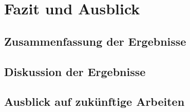 \chapter{Fazit und Ausblick}
\section{Zusammenfassung der Ergebnisse}
\section{Diskussion der Ergebnisse}
\section{Ausblick auf zukünftige Arbeiten}
